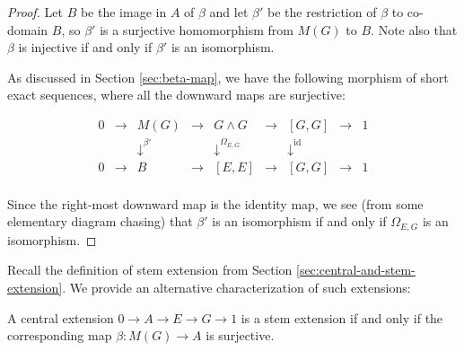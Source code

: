 \begin{proof}
  Let $B$ be the image in $A$ of $\beta$ and let $\beta'$ be the
  restriction of $\beta$ to co-domain $B$, so $\beta'$ is a surjective
  homomorphism from $M(G)$ to $B$. Note also that $\beta$ is injective
  if and only if $\beta'$ is an isomorphism.

  As discussed in Section \ref{sec:beta-map}, we have the following
  morphism of short exact sequences, where all the downward maps are
  surjective:

  $$\begin{array}{ccccccccc}
    0 & \to & M(G) & \to & G \wedge G & \to & [G,G] & \to & 1\\
    &&   \downarrow^{\beta'}  &&  \downarrow^{\Omega_{E,G}}     && \downarrow^{\text{id}} && \\
    0 & \to & B &\to & [E,E] & \to & [G,G] & \to & 1\\
  \end{array}$$
  
  Since the right-most downward map is the identity map, we see (from
  some elementary diagram chasing) that $\beta'$ is an isomorphism if
  and only if $\Omega_{E,G}$ is an isomorphism. 
\end{proof}

Recall the definition of stem extension from Section
\ref{sec:central-and-stem-extension}. We provide an alternative
characterization of such extensions:

\begin{lemma}\label{lemma:stem-beta-surjective}
  A central extension $0 \to A \to E \to G \to 1$ is a stem extension
  if and only if the corresponding map $\beta: M(G) \to A$ is
  surjective.
\end{lemma}

